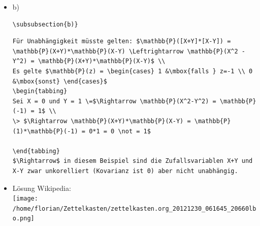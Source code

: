 \documentclass[11pt]{article}
\begin{document}
\begin{itemize}
=> Cov(X+Y, X-Y) = E[ (X+Y) * (X-Y) ] - E(X+Y)E(X-Y)
                    = E[ X$^2$ - Y$^2$ ] - E(X+Y)E(X-Y)

                 = E[ ([X+Y]-E[X+Y]) * ([X-Y] - E[X-Y])  ]
                    = E[  [X+Y][X-Y] - [X+Y]E[X-Y] - E[X+Y][X-Y] + E[X+Y]E[X-Y]   ]
       = E[  X$^2$ - Y$^2$ - (E[X-Y]X + E[X-Y]Y) - (E[X+Y]X - E[X+Y]Y) + E[X+Y]E[X-Y]  ]
       = E[  X$^2$ - Y$^2$ - E[X-Y]X - E[X-Y]Y - E[X+Y]X + E[X+Y]Y + E[X+Y]E[X-Y]  ]

=> Cov(X+Y, X-Y) = Cov(X,X-Y) + Cov(Y,X-Y) = Cov(X-Y,X) + Cov(X-Y, Y) = Cov(X,X) - Cov(Y,X) + Cov(X,Y) - Cov(Y,Y) = Cov(X,X) - Cov(Y,Y)
= Var(X) - Var(Y) = 0 (da gleichverteilt)

\begin{verbatim}
Da X und Y gleichverteilt sind, gilt: $Var(X) = Var(Y) \rightarrow Var(X) - Var(Y) = 0$\\
Durch die symmetrie der Kovarianz lässt sich umformen:\\
$Cov(X+Y, X-Y) = Cov(X,X-Y) + Cov(Y,X-Y) = Cov(X-Y,X) + Cov(X-Y, Y) = Cov(X,X) - Cov(Y,X) + Cov(X,Y) - Cov(Y,Y)$\\
$ = Cov(X,X) - Cov(Y,Y) = Var(X) - Var(Y) = 0$
\end{verbatim}


\item b)\\
\label{sec-3-8-4-2}%
\begin{verbatim}
\subsubsection{b)}
\end{verbatim}


\begin{verbatim}
Für Unabhängigkeit müsste gelten: $\mathbb{P}([X+Y]*[X-Y]) = \mathbb{P}(X+Y)*\mathbb{P}(X-Y) \Leftrightarrow \mathbb{P}(X^2 - Y^2) = \mathbb{P}(X+Y)*\mathbb{P}(X-Y)$ \\
Es gelte $\mathbb{P}(z) = \begin{cases} 1 &\mbox{falls } z=-1 \\ 0 &\mbox{sonst} \end{cases}$
\begin{tabbing}
Sei X = 0 und Y = 1 \=$\Rightarrow \mathbb{P}(X^2-Y^2) = \mathbb{P}(-1) = 1$ \\
\> $\Rightarrow \mathbb{P}(X+Y)*\mathbb{P}(X-Y) = \mathbb{P}(1)*\mathbb{P}(-1) = 0*1 = 0 \not = 1$

\end{tabbing}
$\Rightarrow$ in diesem Beispiel sind die Zufallsvariablen X+Y und X-Y zwar unkorelliert (Kovarianz ist 0) aber nicht unabhängig.
\end{verbatim}


\item Lösung Wikipedia:\\
\label{sec-3-8-4-3}%
\texttt{[image: /home/florian/Zettelkasten/zettelkasten.org\_20121230\_061645\_20660lbo.png]}

\end{itemize} %
\end{document}
